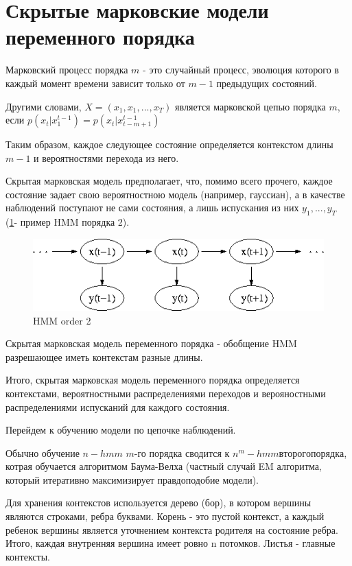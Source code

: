\documentclass[10pt,a4paper]{article}
\begin{document}
\section{Скрытые марковские модели переменного порядка}

Марковский процесс порядка $ m $ - это случайный процесс, эволюция которого в каждый момент времени зависит только от $ m-1 $ предыдущих состояний.

Другими словами, $ X = (x_{1}, x_{1}, ..., x_{T}) $ является марковской цепью порядка $ m $,
если $ p(x_{t}|x_{1}^{t-1}) = p(x_{t}|x_{t-m+1}^{t-1})$

Таким образом, каждое следующее состояние определяется контекстом длины $ m-1 $ и вероятностями перехода из него.

Скрытая марковская модель предполагает, что, помимо всего прочего, каждое состояние задает свою вероятностною модель (например, гауссиан), а в качестве наблюдений поступают не сами состояния, а лишь испускания из них $y_{1},...,y_{T}$ (\ref{ris:image}- пример HMM порядка 2).
\begin{figure}[hbtp]
\includegraphics[scale=0.4]{Hmm_temporal_bayesian_net.png}
\centering
\caption{HMM order 2}
\label{ris:image}
\end{figure}


Скрытая марковская модель переменного порядка - обобщение HMM разрешающее иметь контекстам разные длины.

Итого, скрытая марковская модель переменного порядка определяется контекстами, вероятностными распределениями переходов и верояностными распределениями испусканий для каждого состояния.

Перейдем к обучению модели по цепочке наблюдений.

Обычно обучение $ n-hmm$ $ m $-го порядка сводится к $ n^{m}-hmm второго порядка$, котрая обучается алгоритмом Баума-Велха (частный случай EM алгоритма, который итеративно максимизирует правдоподобие модели).

Для хранения контекстов используется дерево (бор), в котором вершины являются строками, ребра буквами. Корень - это пустой контекст, а каждый ребенок вершины является уточнением контекста родителя на состояние ребра.
Итого, каждая внутренняя вершина имеет ровно n потомков. Листья - главные контексты.
\end{document}
